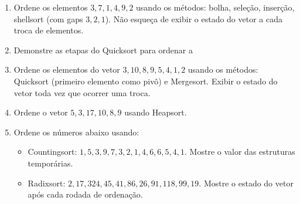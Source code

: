 \begin{enumerate}
\item Ordene os elementos $3, 7, 1, 4, 9, 2$ usando os métodos: bolha, seleção,
inserção, shellsort (com gaps $3, 2, 1$). Não esqueça de exibir o estado do vetor a cada troca
de elementos.

\item Demonstre as etapas do Quicksort para ordenar a 

\item Ordene os elementos do vetor $3, 10, 8, 9, 5, 4, 1, 2$ usando os métodos: 
Quicksort (primeiro elemento como pivô) e Mergesort. Exibir o estado do vetor toda vez que ocorrer 
uma troca.

\item Ordene o vetor $5, 3, 17, 10, 8, 9$ usando Heapsort.

\item Ordene os números abaixo usando:
	\begin{itemize}
	\item Countingsort: $1, 5, 3, 9, 7, 3, 2, 1, 4, 6, 6, 5, 4, 1$. Mostre o valor das estruturas temporárias.
	\item Radixsort: $2, 17, 324, 45, 41, 86, 26, 91, 118, 99, 19$. Mostre o estado do vetor após cada rodada de ordenação.
	\end{itemize}
\end{enumerate}
